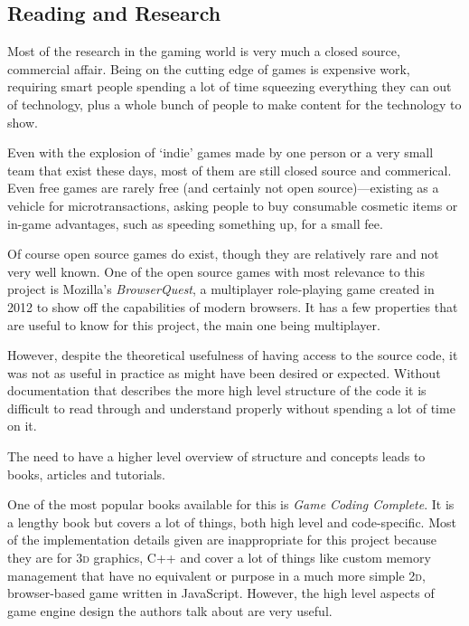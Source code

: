\subsection{Reading and Research}
Most of the research in the gaming world is very much a closed source, commercial affair. Being on the cutting edge of games is expensive work, requiring smart people spending a lot of time squeezing everything they can out of technology, plus a whole bunch of people to make content for the technology to show.

Even with the explosion of `indie' games made by one person or a very small team that exist these days, most of them are still closed source and commerical. Even free games are rarely free (and certainly not open source)---existing as a vehicle for microtransactions, asking people to buy consumable cosmetic items or in-game advantages, such as speeding something up, for a small fee.

Of course open source games do exist, though they are relatively rare and not very well known. One of the open source games with most relevance to this project is Mozilla's \textit{BrowserQuest}\cite{citeulike:13139186, citeulike:13139189, citeulike:13139194}, a multiplayer role-playing game created in 2012 to show off the capabilities of modern browsers. It has a few properties that are useful to know for this project, the main one being multiplayer.

However, despite the theoretical usefulness of having access to the source code, it was not as useful in practice as might have been desired or expected. Without documentation that describes the more high level structure of the code it is difficult to read through and understand properly without spending a lot of time on it.

The need to have a higher level overview of structure and concepts leads to books, articles and tutorials.

One of the most popular books available for this is \textit{Game Coding Complete}\cite{citeulike:12394552}. It is a lengthy book but covers a lot of things, both high level and code-specific. Most of the implementation details given are inappropriate for this project because they are for \textsc{3d} graphics, C++ and cover a lot of things like custom memory management that have no equivalent or purpose in a much more simple \textsc{2d}, browser-based game written in JavaScript. However, the high level aspects of game engine design the authors talk about are very useful.

